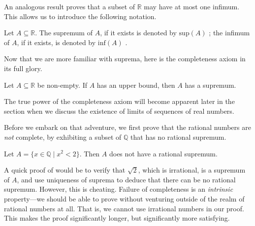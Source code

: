 An analogous result proves that a subset of $\mathbb{R}$ may have at most one infimum. This allows us to introduce the following notation.

\begin{definition}
Let $A \subseteq \mathbb{R}$. The supremum of $A$, if it exists is denoted by $\mathrm{sup}(A)$ ; the infimum of $A$, if it exists, is denoted by $\mathrm{inf}(A)$ .
\end{definition}

Now that we are more familiar with suprema, here is the completeness axiom in its full glory.

\begin{axiom}
\label{axCompletenessOfR}
Let $A \subseteq \mathbb{R}$ be non-empty. If $A$ has an upper bound, then $A$ has a supremum.
\end{axiom}

The true power of the completeness axiom will become apparent later in the section when we discuss the existence of limits of sequences of real numbers.

Before we embark on that adventure, we first prove that the rational numbers are \textit{not} complete, by exhibiting a subset of $\mathbb{Q}$ that has no rational supremum.

\begin{proposition}
\label{propIrrationalsNotComplete}
Let $A = \{ x \in \mathbb{Q} \mid x^2 < 2 \}$. Then $A$ does not have a rational supremum.
\end{proposition}

A quick proof of  would be to verify that $\sqrt{2}$, which is irrational, is a supremum of $A$, and use uniqueness of suprema to deduce that there can be no rational supremum. However, this is cheating. Failure of completeness is an \textit{intrinsic} property---we should be able to prove  without venturing outside of the realm of rational numbers at all. That is, we cannot use irrational numbers in our proof. This makes the proof significantly longer, but significantly more satisfying.

